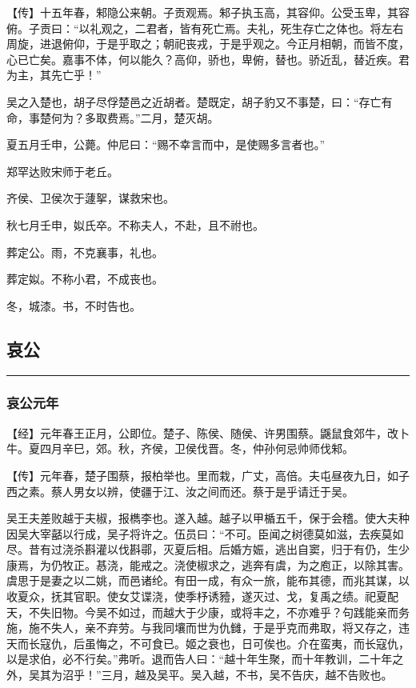 \documentclass[]{article}
\begin{document}
【传】十五年春，邾隐公来朝。子贡观焉。邾子执玉高，其容仰。公受玉卑，其容俯。子贡曰：``以礼观之，二君者，皆有死亡焉。夫礼，死生存亡之体也。将左右周旋，进退俯仰，于是乎取之；朝祀丧戎，于是乎观之。今正月相朝，而皆不度，心已亡矣。嘉事不体，何以能久？高仰，骄也，卑俯，替也。骄近乱，替近疾。君为主，其先亡乎！''

吴之入楚也，胡子尽俘楚邑之近胡者。楚既定，胡子豹又不事楚，曰：``存亡有命，事楚何为？多取费焉。''二月，楚灭胡。

夏五月壬申，公薨。仲尼曰：``赐不幸言而中，是使赐多言者也。''

郑罕达败宋师于老丘。

齐侯、卫侯次于蘧挐，谋救宋也。

秋七月壬申，姒氏卒。不称夫人，不赴，且不祔也。

葬定公。雨，不克襄事，礼也。

葬定姒。不称小君，不成丧也。

冬，城漆。书，不时告也。

\hypertarget{header-n3043}{%
\subsection{哀公}\label{header-n3043}}

\begin{center}\rule{0.5\linewidth}{\linethickness}\end{center}

\hypertarget{header-n3045}{%
\subsubsection{哀公元年}\label{header-n3045}}

【经】元年春王正月，公即位。楚子、陈侯、随侯、许男围蔡。鼷鼠食郊牛，改卜牛。夏四月辛巳，郊。秋，齐侯，卫侯伐晋。冬，仲孙何忌帅师伐邾。

【传】元年春，楚子围蔡，报柏举也。里而栽，广丈，高倍。夫屯昼夜九日，如子西之素。蔡人男女以辨，使疆于江、汝之间而还。蔡于是乎请迁于吴。

吴王夫差败越于夫椒，报檇李也。遂入越。越子以甲楯五千，保于会稽。使大夫种因吴大宰嚭以行成，吴子将许之。伍员曰：``不可。臣闻之树德莫如滋，去疾莫如尽。昔有过浇杀斟灌以伐斟鄩，灭夏后相。后婚方娠，逃出自窦，归于有仍，生少康焉，为仍牧正。惎浇，能戒之。浇使椒求之，逃奔有虞，为之庖正，以除其害。虞思于是妻之以二姚，而邑诸纶。有田一成，有众一旅，能布其德，而兆其谋，以收夏众，抚其官职。使女艾谍浇，使季杼诱豷，遂灭过、戈，复禹之绩。祀夏配天，不失旧物。今吴不如过，而越大于少康，或将丰之，不亦难乎？句践能亲而务施，施不失人，亲不弃劳。与我同壤而世为仇雠，于是乎克而弗取，将又存之，违天而长寇仇，后虽悔之，不可食已。姬之衰也，日可俟也。介在蛮夷，而长寇仇，以是求伯，必不行矣。''弗听。退而告人曰：``越十年生聚，而十年教训，二十年之外，吴其为沼乎！''三月，越及吴平。吴入越，不书，吴不告庆，越不告败也。
\end{document}
